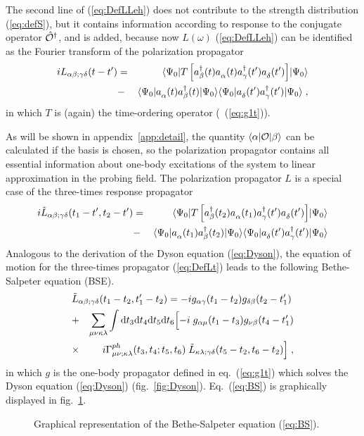 The second line of (\ref{eq:DefLLeh}) does not contribute to the strength 
distribution
(\ref{eq:defS}), but it contains information according to response to the
conjugate operator $\opO^\dagger$, and is 
added, because now $L(\omega)$ (\ref{eq:DefLLeh}) can be identified as the 
Fourier transform
of the polarization propagator
%
	\begin{eqnarray}
		iL_{\alpha\beta;\gamma\delta}(t-t')
	&=&
		\ME<\Psi_0|
		T\left[
			\Oc{\beta}(t)\Oa{\alpha}(t)
			\Oc{\gamma}(t')\Oa{\delta}(t')
		\right]
		|\Psi_0>
	\nonumber \\
	&-&
		\ME<\Psi_0|\Oa{\alpha}(t)\Oc{\beta}(t)|\Psi_0>
		\ME<\Psi_0|\Oa{\delta}(t')\Oc{\gamma}(t')|\Psi_0>
	\label{eq:DefL}
	\;,
	\end{eqnarray}
%
in which $T$ is (again) the time-ordering operator (\cf\ (\ref{eq:g1t})). 

As will be shown in appendix~\ref{app:detail}, the quantity 
$\ME<\alpha|\opOhatless|\beta>$ can be calculated if the basis is chosen, so
the polarization propagator contains all essential
information about one-body excitations of the system to linear approximation
in the probing field. 
The polarization propagator
$L$ is a special case of the three-times response propagator\cite{BAD90}
%
	\begin{eqnarray}
		i\tilde{L}_{\alpha\beta;\gamma\delta}(t_1-t',t_2-t')
	&=&
		\ME<\Psi_0|
		T\left[
		\Oc{\beta}(t_2)\Oa{\alpha}(t_1)
		\Oc{\gamma}(t')\Oa{\delta}(t')
		\right]
		|\Psi_0>
	\label{eq:DefLt} \\
	&-&
		\ME<\Psi_0|\Oa{\alpha}(t_1)\Oc{\beta}(t_2)|\Psi_0>
		\ME<\Psi_0|\Oa{\delta}(t')\Oc{\gamma}(t')|\Psi_0>
	\nonumber
	\end{eqnarray}
%
Analogous to the derivation of the Dyson equation (\ref{eq:Dyson}),
the equation of motion for the three-times propagator (\ref{eq:DefLt}) leads
to  the following Bethe-Salpeter 
equation\cite{BK61} (BSE). 
%
%
	\begin{eqnarray}
		\lefteqn{\tilde{L}_{\alpha\beta;\gamma\delta}(t_1-t_2,t'_1-t_2)
	=
		-ig_{\alpha\gamma}(t_1-t_2)g_{\delta\beta}(t_2-t'_1)
	}
	\label{eq:BS} \\
	&+&
		\sum_{\mu\nu\kappa\lambda}
		\int {\rm d}t_3 {\rm d}t_4 {\rm d}t_5 {\rm d}t_6
		\Bigl[
			-i\;g_{\alpha\mu}(t_1-t_3)g_{\nu\beta}(t_4-t'_1)
	\nonumber\\
	&\times&
		i\Gamma_{\mu\nu;\kappa\lambda}^{ph}(t_3,t_4;t_5,t_6)
		\;\tilde{L}_{\kappa\lambda;\gamma\delta}(t_5-t_2,t_6-t_2)
		\Bigr] \;,
	\nonumber
	\end{eqnarray}
%
in which $g$ is the one-body propagator defined in eq.~(\ref{eq:g1t})
which solves the Dyson equation (\ref{eq:Dyson}) (fig.~\ref{fig:Dyson}).
Eq.~(\ref{eq:BS}) is graphically displayed in fig.~\ref{fig:BSE}.
\begin{figure}
\centerline{
}
\caption[]{
Graphical representation of the Bethe-Salpeter equation (\ref{eq:BS}).
\label{fig:BSE}}
\end{figure}

